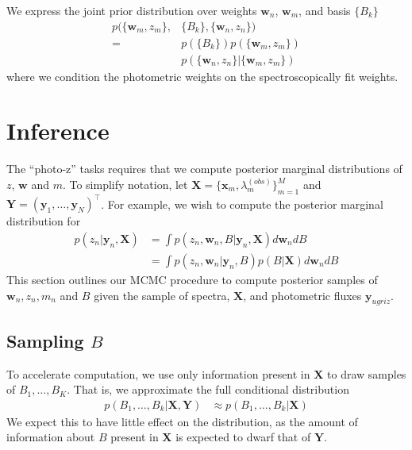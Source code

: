 \documentclass{article}
\newcommand{\trans}{\intercal}
\begin{document}
We express the joint prior distribution over weights $\mathbf{w}_n$, $\mathbf{w}_m$, and basis $\{B_k\}$
\begin{align}
  p( \{ \mathbf{w}_m, z_m \}, &\{ B_k \}, \{ \mathbf{w}_n, z_n \} )  \\
    = & p(\{ B_k \}) p( \{ \mathbf{w}_m, z_m \} )  \\
      & p( \{ \mathbf{w}_n, z_n \} | \{ \mathbf{w}_m, z_m \} ) 
\end{align}
where we condition the photometric weights on the spectroscopically fit weights.  


\section{Inference}
\label{sec:inference}
The ``photo-z'' tasks requires that we compute posterior marginal distributions of $z$, $\mathbf{w}$ and $m$.  To simplify notation, let $\mathbf{X} = \{\mathbf{x}_m, \lambda^{(obs)}_m \}_{m=1}^M$ and $\mathbf{Y} = ( \mathbf{y}_1, \dots, \mathbf{y}_N )^\trans$.   
For example, we wish to compute the posterior marginal distribution for
\begin{align}
  p(z_n | \mathbf{y}_n, \mathbf{X}) 
    &= \int p(z_n, \mathbf{w}_n, B | \mathbf{y}_n, \mathbf{X}) d\mathbf{w}_n dB \\
    &= \int p(z_n, \mathbf{w}_n | \mathbf{y}_n, B) p(B | \mathbf{X}) d\mathbf{w}_n dB
\end{align}
This section outlines our MCMC procedure to compute posterior samples of $\mathbf{w}_n, z_n, m_n$ and $B$ given the sample of spectra, $\mathbf{X}$, and photometric fluxes $\mathbf{y}_{ugriz}$.  

\subsection{Sampling $B$}
To accelerate computation, we use only information present in $\mathbf{X}$ to draw samples of $B_1, \dots, B_K$.  That is, we approximate the full conditional distribution 
\begin{align}
  p(B_1,\dots, B_k | \mathbf{X}, \mathbf{Y}) 
    &\approx p(B_1, \dots, B_k | \mathbf{X})
\end{align}
We expect this to have little effect on the distribution, as the amount of information about $B$ present in $\mathbf{X}$ is expected to dwarf that of $\mathbf{Y}$.  
\end{document}
